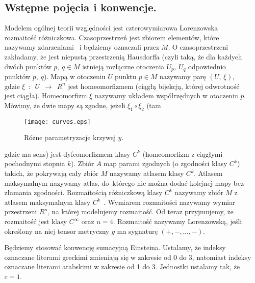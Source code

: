 \subsection{Wstępne pojęcia i konwencje.}
Modelem ogólnej teorii względności jest czterowymiarowa Lorenzowska 
rozmaitość różniczkowa. 
Czasoprzestrzeń jest zbiorem elementów, które nazywamy 
zdarzeniami~\cite{trau1984} i będziemy oznaczali przez $M$.
O czasoprzestrzeni zakładamy, że jest
 niepustą przestrzenią Hausdorffa (czyli taką, że
dla każdych dwóch punktów $p,\ q\in M$ 
istnieją rozłączne otoczenia $U_p,\ U_q$ odpowiednio punktów $p,\ q$). 
Mapą w otoczeniu $U$ punktu $p\in M$ nazywamy parę $(U,\ \xi )$, gdzie  
$\xi$~$:$~$U$~$\to$~$R^n$ jest homeomorfizmem (ciągłą bijekcją, której 
odwrotność jest ciągła). 
Homeomorfizm $\xi$ nazywamy układem współrzędnych 
w otoczeniu $p$.
Mówimy, że dwie mapy są zgodne, jeżeli $\xi_1 \circ \xi_2$ (tam 
\begin{wrapfigure}[29]{r}{4cm}
\centering
\texttt{[image: curves.eps]}
\caption{Różne parametryzacje krzywej $y$.}
\end{wrapfigure}
gdzie ma sens)
jest dyfeomorfizmem klasy $C^k$ (homeomorfizm z 
ciągłymi pochodnymi stopnia $k$). 
Zbiór $A$ map
 parami zgodnych (o zgodności klasy $C^k$) 
takich, że pokrywają cały zbiór $M$ nazywamy 
atlasem klasy $C^k$. Atlasem maksymalnym nazywamy atlas, do~którego
nie można dodać kolejnej mapy bez złamania zgodności.
Rozmaitością różniczkową klasy $C^k$ nazywamy 
zbiór $M$ z atlasem maksymalnym klasy $C^k$~\cite{ganca1987}.
Wymiarem rozmaitości nazywamy wymiar przestrzeni $R^n$, na której 
modelujemy rozmaitość. Od teraz przyjmujemy, że rozmaitość 
jest klasy $C^\infty$ oraz $n=4$.
Rozmaitość nazywamy Lorenzowską, jeśli określony na niej tensor
metryczny $g$ ma sygnaturę $(+,-,\dots ,-)$.

Będziemy stosować konwencję sumacyjną Einsteina. Ustalamy, że 
indeksy oznaczane literami greckimi zmieniają się w zakresie od 0 do 3, 
natomiast indeksy oznaczane literami arabskimi 
w zakresie od 1 do 3. Jednostki ustalamy tak, że $c=1$.
